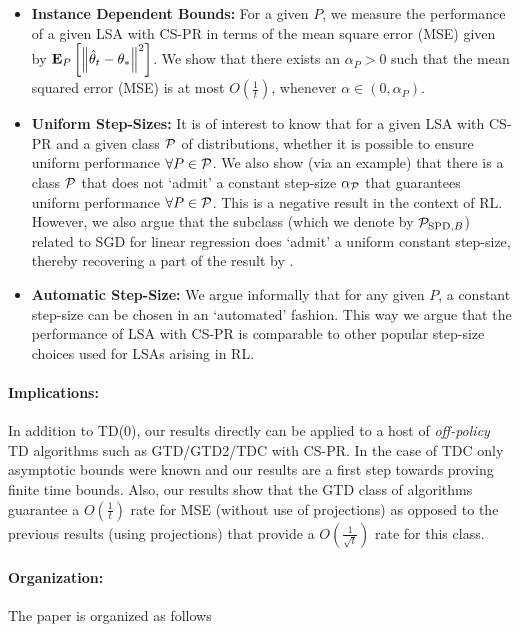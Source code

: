 \begin{itemize}[leftmargin=*]%
\item \textbf{Instance Dependent Bounds:} For a given $P$, we  measure the performance of a given LSA with CS-PR in terms of the mean square error (MSE) given by $\EEP{\norm{\thh_t-\ts}^2}$. We show that there exists an $\alpha_P>0$ such that the mean squared error (MSE) %
is at most $O(\frac{1}{t})$, whenever $\alpha\in (0,\alpha_P)$.
\item \textbf{Uniform Step-Sizes:} It is of interest to know that for a given LSA with CS-PR and a given class $\P$ of distributions, whether it is possible to ensure uniform performance $\forall P\in \P$. We also show (via an example) that there is a class $\P$ that does not `admit' a constant step-size $\alpha_{\P}$ that guarantees uniform performance $\forall P\in \P$. This is a negative result in the context of RL. However, we also argue that the subclass (which we denote by $\P_{\text{SPD},B}$) related to SGD for linear regression does `admit' a uniform constant step-size, thereby recovering a part of the result by \citet{bach}.
\item \textbf{Automatic Step-Size:} We argue informally that for any given $P$, a constant step-size can be chosen in an `automated' fashion. This way we argue that the performance of LSA with CS-PR is comparable to other popular step-size choices used for LSAs arising in RL.
\end{itemize}
\paragraph{Implications:} In addition to TD(0), our results directly can be applied to a host of \emph{off-policy} TD algorithms such as GTD/GTD2/TDC with CS-PR. In the case of TDC only asymptotic bounds were known \cite{gtd2} and our results are a first step towards proving finite time bounds. Also, our results show that the GTD class of algorithms guarantee a $O(\frac{1}{t})$ rate for MSE (without use of projections) as opposed to the previous results (using projections) \cite{gtdmp} that provide a $O(\frac{1}{\sqrt{t}})$ rate for this class.
\paragraph{Organization:} The paper is organized as follows
